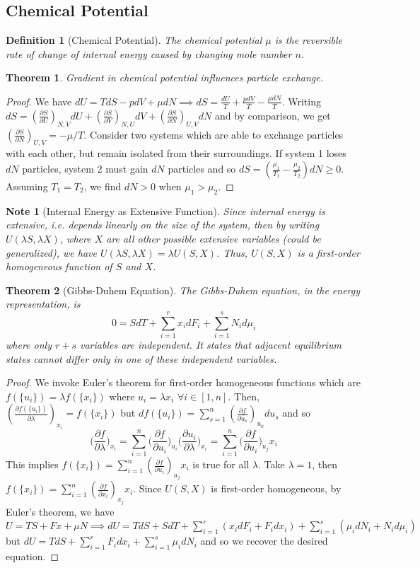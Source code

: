 \documentclass[a4paper]{article}
\newtheorem{Note}{Note}[section]
\theoremstyle{new}
\newtheorem{defi}{Definition}[section]
\newtheorem{thm}{Theorem}[section]
\begin{document}
\subsection{Chemical Potential}
\begin{defi}[Chemical Potential]
The chemical potential $\mu$ is the reversible rate of change of internal energy caused by changing mole number $n$.
\end{defi}
\begin{thm}
Gradient in chemical potential influences particle exchange.
\end{thm}
\begin{proof}
We have $dU=TdS-pdV+\mu dN\implies dS=\frac{dU}{T}+\frac{pdV}{T}-\frac{\mu dN}{T}$. Writing $dS=(\frac{\partial S}{\partial U})_{N,V}dU+(\frac{\partial S}{\partial V})_{N,U}dV+(\frac{\partial S}{\partial N})_{U,V}dN$ and by comparison, we get $(\frac{\partial S}{\partial N})_{U,V}=-\mu/T$. Consider two systems which are able to exchange particles with each other, but remain isolated from their surroundings. If system 1 loses $dN$ particles, system 2 must gain $dN$ particles and so $dS=(\frac{\mu_1}{T_1}-\frac{\mu_2}{T_2})dN\geq0$. Assuming $T_1=T_2$, we find $dN>0$ when $\mu_1>\mu_2$.
\end{proof}
\begin{Note}[Internal Energy as Extensive Function]
Since internal energy is extensive, i.e. depends linearly on the size of the system, then by writing $U(\lambda S, \lambda X)$, where $X$ are all other possible extensive variables (could be generalized), we have $U(\lambda S,\lambda X)=\lambda U(S,X)$. Thus, $U(S,X)$ is a first-order homogeneous function of $S$ and $X$.
\end{Note}
\begin{thm}[Gibbs-Duhem Equation]
The Gibbs-Duhem equation, in the energy representation, is
\begin{equation}
0=SdT+\sum_{i=1}^rx_idF_i+\sum_{i=1}^sN_id\mu_i\label{GibbsDuhem}
\end{equation}
where only $r+s$ variables are independent. It states that adjacent equilibrium states cannot differ only in one of these independent variables.
\end{thm}
\begin{proof}
We invoke Euler's theorem for first-order homogeneous functions which are $f(\{u_i\})=\lambda f(\{x_i\})$ where $u_i=\lambda x_i$ $\forall i\in[1,n]$. Then, $(\frac{\partial f(\{u_i\})}{\partial \lambda})_{x_i}=f(\{x_i\})$ but $df(\{u_i\})=\sum_{s=1}^n(\frac{\partial f}{\partial u_s})_{u_k}du_s$ and so
$$\bigg(\frac{\partial f}{\partial\lambda}\bigg)_{x_i}=\sum_{i=1}^n\bigg(\frac{\partial f}{\partial u_i}\bigg)_{u_i}\bigg(\frac{\partial u_i}{\partial\lambda}\bigg)_{x_i}=\sum_{i=1}^n\bigg(\frac{\partial f}{\partial u_i}\bigg)_{u_j}x_i$$
This implies $f(\{x_i\})=\sum_{i=1}^n(\frac{\partial f}{\partial u_i})_{u_j}x_i$ is true for all $\lambda$. Take $\lambda=1$, then $f(\{x_i\})=\sum_{i=1}^n(\frac{\partial f}{\partial x_i})_{x_j}x_i$. Since $U(S,X)$ is first-order homogeneous, by Euler's theorem, we have $U=TS+Fx+\mu N\implies dU=TdS+SdT+\sum_{i=1}^r(x_idF_i+F_idx_i)+\sum_{i=1}^s(\mu_idN_i+N_id\mu_i)$ but $dU=TdS+\sum_{i=1}^rF_idx_i+\sum_{i=1}^s\mu_idN_i$ and so we recover the desired equation.
\end{proof}
\end{document}
